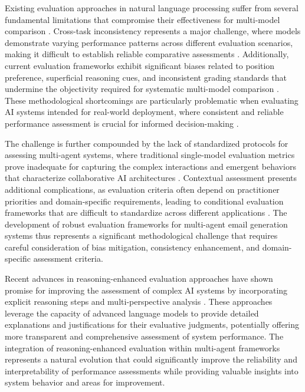 Existing evaluation approaches in natural language processing suffer from several fundamental limitations that compromise their effectiveness for multi-model comparison \cite{maharana2023cococon, ni2024mixeval_x}. Cross-task inconsistency represents a major challenge, where models demonstrate varying performance patterns across different evaluation scenarios, making it difficult to establish reliable comparative assessments \cite{maharana2023cococon}. Additionally, current evaluation frameworks exhibit significant biases related to position preference, superficial reasoning cues, and inconsistent grading standards that undermine the objectivity required for systematic multi-model comparison \cite{ye2024justice_prejudice, wang2025judging_bias_lrms}. These methodological shortcomings are particularly problematic when evaluating AI systems intended for real-world deployment, where consistent and reliable performance assessment is crucial for informed decision-making \cite{ni2024mixeval_x}.

The challenge is further compounded by the lack of standardized protocols for assessing multi-agent systems, where traditional single-model evaluation metrics prove inadequate for capturing the complex interactions and emergent behaviors that characterize collaborative AI architectures \cite{li2024generation_to_judgment, xu2025contextual_judge_bench}. Contextual assessment presents additional complications, as evaluation criteria often depend on practitioner priorities and domain-specific requirements, leading to conditional evaluation frameworks that are difficult to standardize across different applications \cite{xu2025contextual_judge_bench}. The development of robust evaluation frameworks for multi-agent email generation systems thus represents a significant methodological challenge that requires careful consideration of bias mitigation, consistency enhancement, and domain-specific assessment criteria.

Recent advances in reasoning-enhanced evaluation approaches have shown promise for improving the assessment of complex AI systems by incorporating explicit reasoning steps and multi-perspective analysis \cite{marjanovic2025deepseek_thoughtology, sui2025stop_overthinking}. These approaches leverage the capacity of advanced language models to provide detailed explanations and justifications for their evaluative judgments, potentially offering more transparent and comprehensive assessment of system performance. The integration of reasoning-enhanced evaluation within multi-agent frameworks represents a natural evolution that could significantly improve the reliability and interpretability of performance assessments while providing valuable insights into system behavior and areas for improvement.

